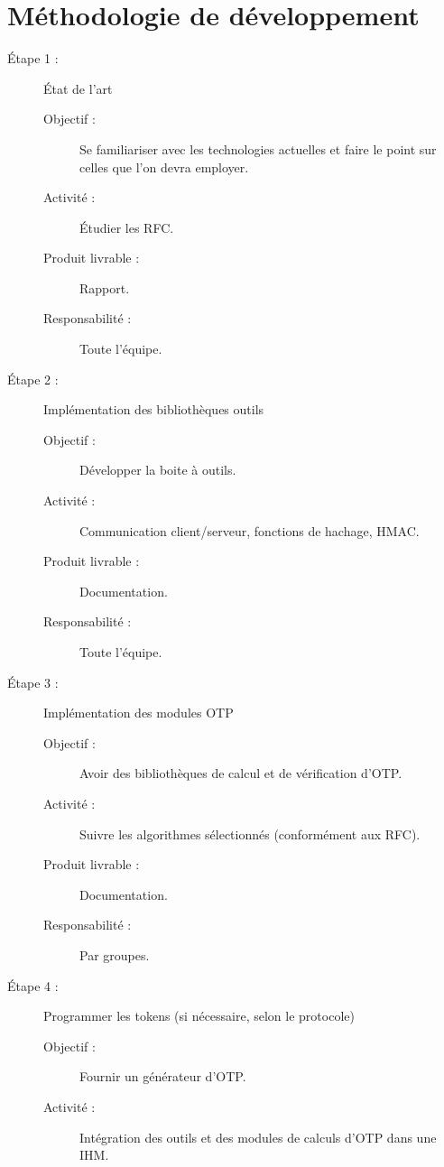 \documentclass{../../res/univ-projet}
\begin{document}
\section{Méthodologie de développement}
	\begin{description}
	    \item [Étape 1 :] État de l'art
		    \begin{description}
		        \item [Objectif :] Se familiariser avec les technologies actuelles et faire le point sur celles que l'on devra employer.
		        \item [Activité :] Étudier les RFC.
		        \item [Produit livrable :] Rapport.
		        \item [Responsabilité :] Toute l'équipe.
            \end{description}
	    \item [Étape 2 :] Implémentation des bibliothèques outils
		    \begin{description}
		        \item [Objectif :] Développer la boite à outils.
		        \item [Activité :] Communication client/serveur, fonctions de hachage, HMAC.
		        \item [Produit livrable :] Documentation.
		        \item [Responsabilité :] Toute l'équipe.
		    \end{description}
	    \item [Étape 3 :] Implémentation des modules OTP
		    \begin{description}
		        \item [Objectif :] Avoir des bibliothèques de calcul et de vérification d'OTP.
		        \item [Activité :] Suivre les algorithmes sélectionnés (conformément aux RFC).
		        \item [Produit livrable :] Documentation.
		        \item [Responsabilité :] Par groupes.
		    \end{description}
	    \item [Étape 4 :] Programmer les tokens (si nécessaire, selon le protocole)
		    \begin{description}
		        \item [Objectif :] Fournir un générateur d'OTP.
		        \item [Activité :] Intégration des outils et des modules de calculs d'OTP dans une IHM.

\end{description}
\end{description}
\end{document}
